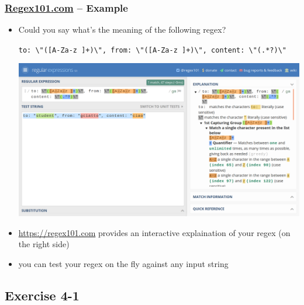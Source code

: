 \documentclass[presentation]{beamer}\mode<presentation>{\usetheme{AMSCesenaPurpleAndGold}}
\begin{document}
\begin{frame}
\frametitle{\href{https://regex101.com/}{Regex101.com} -- Example}

\begin{itemize}
\item Could you say what's the meaning of the following regex?
%
\begin{center}
\small\alert{
\texttt{to:\,\textbackslash{}"([A-Za-z ]+)\textbackslash{}",\,from:\,\textbackslash{}"([A-Za-z ]+)\textbackslash{}",\,content:\,\textbackslash{}"(.*?)\textbackslash{}"}}
\end{center}
%

%
\begin{center}
\includegraphics[width=.7\linewidth]{./img/regex101.png}
\end{center}

\item \url{https://regex101.com} provides an interactive explaination of your regex (on the right side) 

\item you can test your regex on the fly against any input string

\end{itemize}  
\end{frame}

\subsection{Exercise 4-1} 
\end{document}
